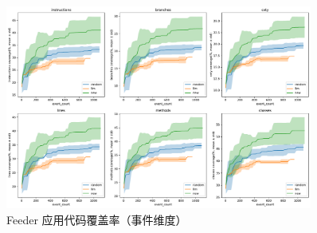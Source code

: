 \documentclass[twocolumn, 10pt]{article}
\begin{document}
\begin{figure}[H]
\centering
\includegraphics[width=0.9\textwidth]{com.nononsenseapps.feeder.debug/coverage_event.pdf}
\caption{Feeder 应用代码覆盖率（事件维度）}
\end{figure}
\end{document}
